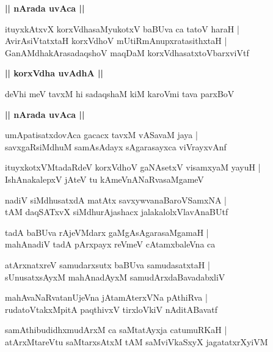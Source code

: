 \documentclass[twoside,12pt,openright]{book}
\newcounter{shloka}[chapter]
\def\uvaca#1{\centerline{{\large\textbf{#1}}}}
\begin{document}
\uvaca{|| nArada uvAca ||}

\begin{shloka}%
ituyxkAtxvX korxVdhasaMyukotxV baBUva ca tatoV haraH |\\
AvirAsiVtatxtaH korxVdhoV mUtiRmAnupxratasithxtaH |\\
GanAMdhakArasadaqshoV maqDaM korxVdhasatxtoVbarxviVtf
\end{shloka}

\uvaca{|| korxVdha uvAdhA ||}

\begin{shloka}%
deVhi meV tavxM hi sadaqshaM kiM karoVmi tava parxBoV 
\end{shloka}

\uvaca{|| nArada uvAca ||}

\begin{shloka}%
umApatisatxdovAca gacacx tavxM vASavaM jaya |\\
savxgaRsiMdhuM samAsAdayx sAgarasayxca viVrayxvAnf 
\end{shloka}

\begin{shloka}%
ituyxkotxVMtadaRdeV korxVdhoV gaNAsetxV visamxyaM yayuH |\\
IshAnakalepxV jAteV tu kAmeVnANaRvasaMgameV 
\end{shloka}

\begin{shloka}%
nadiV siMdhusatxdA matAtx savxywvanaBaroVSamxNA |\\
tAM daqSATxvX siMdhurAjashacx jalakalolxVlavAnaBUtf
\end{shloka}

\begin{shloka}%
tadA baBUva rAjeVMdarx gaMgAsAgarasaMgamaH |\\
mahAnadiV tadA pArxpayx reVmeV cAtamxbaleVna ca 
\end{shloka}

\begin{shloka}%
atArxnatxreV samudarxsutx baBUva samudasatxtaH |\\
sUnusatxsAyxM mahAnadAyxM samudArxdaBavadabxliV 
\end{shloka}

\begin{shloka}%
mahAvaNaRvatanUjeVna jAtamAterxVNa pAthiRva |\\
rudatoVtakxMpitA paqthivxV tirxloVkiV nAditABavatf
\end{shloka}

\begin{shloka}%
samAthibudidhxmudArxM ca saMtatAyxja catumuRKaH |\\
atArxMtareVtu saMtarxsAtxM tAM saMviVkaSxyX jagatatxrXyiVM 
\end{shloka}
\end{document}
